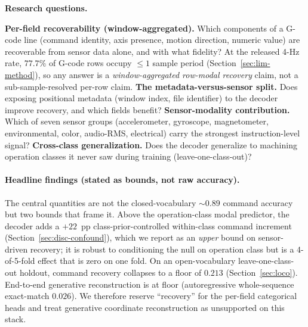 \documentclass[sensors,article,submit,moreauthors,pdftex]{Definitions/mdpi}
\begin{document}
\textbf{Research questions.}
\begin{enumerate}[label=\textbf{RQ\arabic*.}, leftmargin=*]\let\item\olditem
\item \textbf{Per-field recoverability (window-aggregated).} Which components of a G-code line (command identity, axis presence, motion direction, numeric value) are recoverable from sensor data alone, and with what fidelity? At the released 4-Hz rate, $77.7\%$ of G-code rows occupy $\le\!1$ sample period (Section~\ref{sec:lim-method}), so any answer is a \emph{window-aggregated row-modal recovery} claim, not a sub-sample-resolved per-row claim.
\item \textbf{The metadata-versus-sensor split.} Does exposing positional metadata (window index, file identifier) to the decoder improve recovery, and which fields benefit?
\item \textbf{Sensor-modality contribution.} Which of seven sensor groups (accelerometer, gyroscope, magnetometer, environmental, color, audio-RMS, electrical) carry the strongest instruction-level signal?
\item \textbf{Cross-class generalization.} Does the decoder generalize to machining operation classes it never saw during training (leave-one-class-out)?
\end{enumerate}

\paragraph{Headline findings (stated as bounds, not raw accuracy).} The central quantities are not the closed-vocabulary $\sim\!0.89$ command accuracy but two bounds that frame it. Above the operation-class modal predictor, the decoder adds a $+22$~pp class-prior-controlled within-class command increment (Section~\ref{sec:disc-confound}), which we report as an \emph{upper} bound on sensor-driven recovery; it is robust to conditioning the null on operation class but is a 4-of-5-fold effect that is zero on one fold. On an open-vocabulary leave-one-class-out holdout, command recovery collapses to a floor of $0.213$ (Section~\ref{sec:loco}). End-to-end generative reconstruction is at floor (autoregressive whole-sequence exact-match $0.026$). We therefore reserve ``recovery'' for the per-field categorical heads and treat generative coordinate reconstruction as unsupported on this stack.
\end{document}
